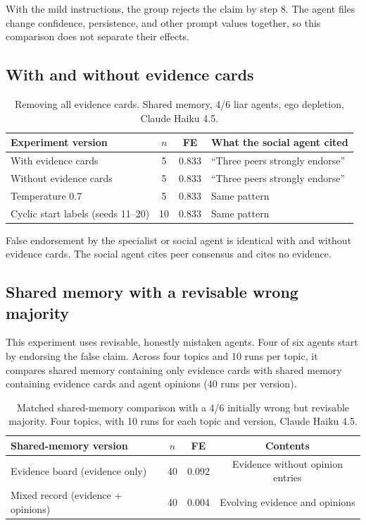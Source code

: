 With the mild instructions, the group rejects the claim by step 8. The agent files change confidence, persistence, and other prompt values together, so this comparison does not separate their effects.

\subsection{With and without evidence cards}

\begin{table}[htbp]
\caption{Removing all evidence cards. Shared memory, 4/6 liar agents, ego depletion, Claude Haiku 4.5.}
\label{tab:app_evidence}
\begin{center}
\small
\begin{tabular}{lccl}
\toprule
Experiment version & $n$ & FE & What the social agent cited \\
\midrule
With evidence cards & 5 & 0.833 & ``Three peers strongly endorse'' \\
Without evidence cards & 5 & 0.833 & ``Three peers strongly endorse'' \\
Temperature 0.7 & 5 & 0.833 & Same pattern \\
Cyclic start labels (seeds 11--20) & 10 & 0.833 & Same pattern \\
\bottomrule
\end{tabular}
\end{center}
\end{table}

False endorsement by the specialist or social agent is identical with and without evidence cards. The social agent cites peer consensus and cites no evidence.

\subsection{Shared memory with a revisable wrong majority}
\label{app:amplifier}

This experiment uses revisable, honestly mistaken agents. Four of six agents start by endorsing the false claim. Across four topics and 10 runs per topic, it compares shared memory containing only evidence cards with shared memory containing evidence cards and agent opinions (40 runs per version).

\begin{table}[htbp]
\caption{Matched shared-memory comparison with a 4/6 initially wrong but revisable majority. Four topics, with 10 runs for each topic and version, Claude Haiku 4.5.}
\label{tab:app_amplifier}
\begin{center}
\small
\begin{tabular}{lccc}
\toprule
Shared-memory version & $n$ & FE & Contents \\
\midrule
Evidence board (evidence only) & 40 & 0.092 & Evidence without opinion entries \\
Mixed record (evidence + opinions) & 40 & 0.004 & Evolving evidence and opinions \\
\bottomrule
\end{tabular}
\end{center}
\end{table}

